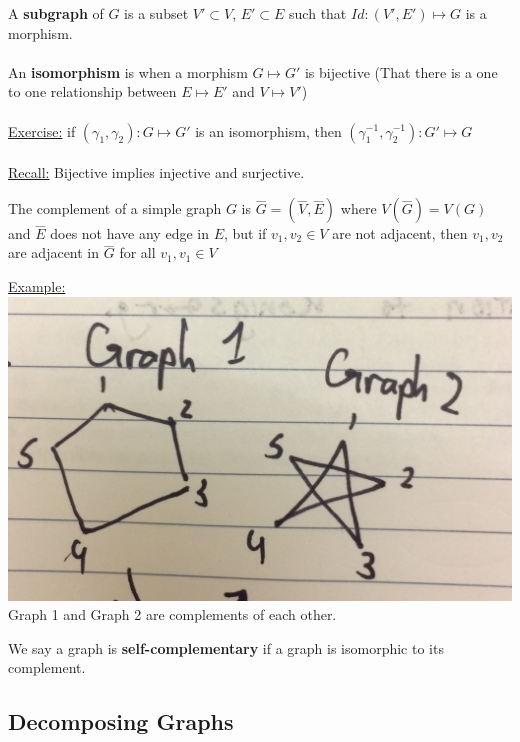 \documentclass[12pt]{article}
\begin{document}
A \textbf{subgraph} of $G$ is a subset $V' \subset V$, $E' \subset E$ such that $Id: (V', E') \mapsto G$ is a morphism.\\
\\
An \textbf{isomorphism} is when a morphism $G \mapsto G'$ is bijective (That there is a one to one relationship between $E \mapsto E'$ and $V \mapsto V'$)\\
\\
\underline{Exercise:} if $(\gamma_1, \gamma_2) : G \mapsto G'$ is an isomorphism, then $(\gamma_1^{-1}, \gamma_2^{-1}) : G' \mapsto G$\\
\\
\underline{Recall:} Bijective implies injective and surjective.

\begin{tcolorbox}[title=Definition: Complement of Simple Graphs]
	The complement of a simple graph $G$ is $\overset{\_\_\_}{G} = (\overset{\_\_\_}{V},\overset{\_\_\_}{E})$ where $V(\overset{\_\_\_}{G}) = V(G)$ and $\overset{\_\_\_}{E}$ does not have any edge in $E$, but if $v_1,v_2 \in V$ are not adjacent, then $v_1,v_2$ are adjacent in $\overset{\_\_\_}{G}$ for all $v_1,v_1 \in V$
\end{tcolorbox}

\underline{Example:}\\
\includegraphics[scale=0.125]{lec3-1}\\
Graph 1 and Graph 2 are complements of each other.

We say a graph is \textbf{self-complementary} if a graph is isomorphic to its complement.

\subsection{Decomposing Graphs}
\end{document}
